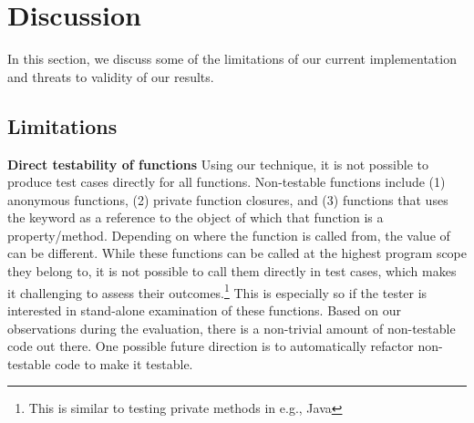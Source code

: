 \section{Discussion} \label{Sec:discussion}
In this section, we discuss some of the limitations of our current implementation and threats to validity of our results.

\subsection{Limitations}

\textbf{Direct testability of functions} Using our technique, it is not possible to produce test cases directly for all \javascript functions.
Non-testable \javascript functions include (1) anonymous functions, (2) private function closures, and (3) functions that uses the  keyword as a reference to the object of which that function is a property/method. Depending on where the function is called from, the value of  can be different.
While these functions can be called at the highest program scope they belong to, it is not possible to call them directly in test cases, which makes it challenging to assess their outcomes.\footnote{This is similar to testing private methods in e.g., Java} This is especially so if the tester is interested in stand-alone examination of these functions.  Based on our observations during the evaluation, there is a non-trivial amount of non-testable \javascript code out there. One possible future direction is to automatically refactor non-testable \javascript code to make it testable. 
 
